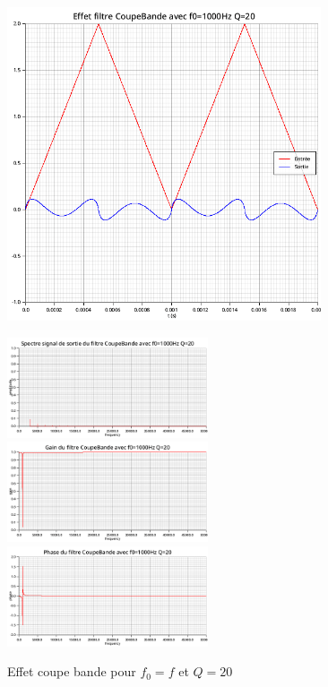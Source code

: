 \documentclass{article}
\begin{document}
\begin{figure}[H]
  \begin{minipage}{0.6\textwidth}
      \centering
      \includegraphics[width=25em]{images/triangulaire/rejecteur/signals.png}
  \end{minipage}
  \begin{minipage}{0.3\textwidth}
      \centering
      \includegraphics[width=16em]{images/triangulaire/rejecteur/fft_out.png}
      \vfill
      \includegraphics[width=16em]{images/triangulaire/rejecteur/gain.png}
      \vfill
      \includegraphics[width=16em]{images/triangulaire/rejecteur/phase.png}
  \end{minipage}
  \caption{Effet coupe bande pour $f_0=f$ et $Q=20$}
\end{figure}
\end{document}
